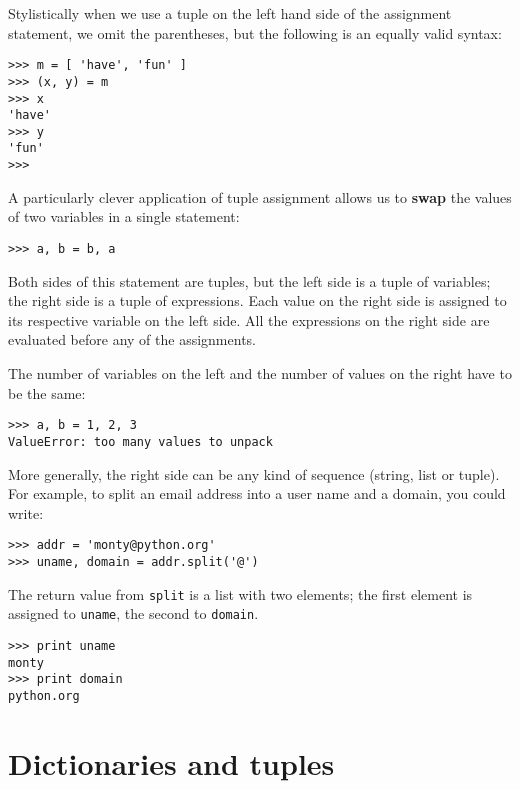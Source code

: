 Stylistically when we use a tuple on the left hand side of the assignment
statement, we omit the parentheses, but the following is an equally 
valid syntax:

\beforeverb
\begin{verbatim}
>>> m = [ 'have', 'fun' ]
>>> (x, y) = m
>>> x
'have'
>>> y
'fun'
>>> 
\end{verbatim}
\afterverb
%
A particularly clever application of tuple assignment allows
us to {\bf swap} the values of two variables in a single statement:

\beforeverb
\begin{verbatim}
>>> a, b = b, a
\end{verbatim}
\afterverb
%
Both sides of this statement are tuples, but
the left side is a tuple of variables; the right side is a tuple of
expressions.  Each value on the right side 
is assigned to its respective variable on the left side.  
All the expressions on the right side are evaluated before any
of the assignments.

The number of variables on the left and the number of
values on the right have to be the same:


\beforeverb
\begin{verbatim}
>>> a, b = 1, 2, 3
ValueError: too many values to unpack
\end{verbatim}
\afterverb
%
More generally, the right side can be any kind of sequence
(string, list or tuple).  For example, to split an email address
into a user name and a domain, you could write:


\beforeverb
\begin{verbatim}
>>> addr = 'monty@python.org'
>>> uname, domain = addr.split('@')
\end{verbatim}
\afterverb
%
The return value from {\tt split} is a list with two elements;
the first element is assigned to {\tt uname}, the second to
{\tt domain}.

\beforeverb
\begin{verbatim}
>>> print uname
monty
>>> print domain
python.org
\end{verbatim}
\afterverb
%

\section{Dictionaries and tuples}

